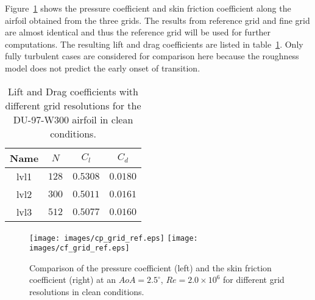 Figure~\ref{fig:gridrefcfcp} shows the pressure coefficient and skin friction coefficient along the airfoil obtained from the three grids. The results from reference grid and fine grid are almost identical and thus the reference grid will be used for further computations. The resulting lift and drag coefficients are listed in table~\ref{tab:gridref2}. Only fully turbulent cases are considered for comparison here because the roughness model does not predict the early onset of transition.
\begin{table}[h!]
\centering
\captionsetup{justification=centering}
\begin{tabular}{ |c|c|c|c| } 
\hline
Name & $N$ & $C_l$ & $C_d$  \\
 \hline
 lvl1 & $128$ & $0.5308$ & $0.0180$ \\ 
 lvl2 & $300$ & $0.5011$ & $0.0161$ \\ 
 lvl3 & $512$ & $0.5077$ & $0.0160$ \\ 
 \hline
\end{tabular}
\caption{Lift and Drag coefficients with different grid resolutions for the DU-97-W300 airfoil in clean conditions.}
\label{tab:gridref2}
\end{table}
\begin{figure}[h]
    \centering
    \captionsetup{justification=centering}
    \texttt{[image: images/cp\_grid\_ref.eps]}
    \texttt{[image: images/cf\_grid\_ref.eps]} 
    \caption{Comparison of the pressure coefficient (left) and the skin friction coefficient (right) at an $AoA = 2.5^{\circ}$, $Re=2.0\times10^6$ for different grid resolutions in clean conditions.}
   \label{fig:gridrefcfcp}
\end{figure}


